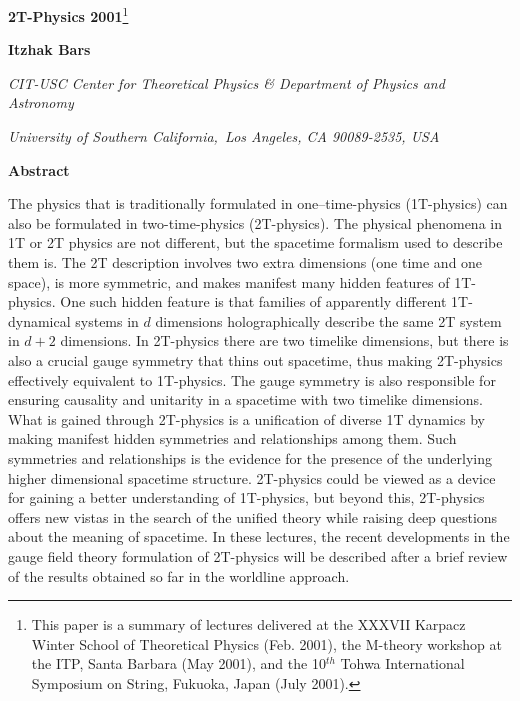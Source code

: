 \documentclass[a4paper,12pt]{article}
\begin{document}

{\vskip1.5cm}

\begin{center}
{\Large \textbf{2T-Physics 2001}}{\footnote{%
This paper is a summary of lectures delivered at the XXXVII
Karpacz Winter School of Theoretical Physics (Feb. 2001), the
M-theory workshop at the ITP, Santa Barbara (May 2001), and the
10$^{th}$ Tohwa International Symposium on String, Fukuoka, Japan
(July 2001).}}

\bigskip

{\vskip0.5cm}

\textbf{Itzhak Bars}

{\vskip0.5cm}

\textsl{CIT-USC Center for Theoretical Physics \& Department of
Physics and Astronomy}

\textsl{University of Southern California,\ Los Angeles, CA
90089-2535, USA}

{\vskip0.5cm}

\textbf{Abstract}
\end{center}

The physics that is traditionally formulated in one--time-physics
(1T-physics) can also be formulated in two-time-physics
(2T-physics). The physical phenomena in 1T or 2T physics are not
different, but the spacetime formalism used to describe them is.
The 2T description involves two extra dimensions (one time and one
space), is more symmetric, and makes manifest many hidden features
of 1T-physics. One such hidden feature is that families of
apparently different 1T-dynamical systems in $d$ dimensions
holographically describe the same 2T system in $d+2$ dimensions.
In 2T-physics there are two timelike dimensions, but there is also
a crucial gauge symmetry that thins out spacetime, thus making
2T-physics effectively equivalent to 1T-physics. The gauge
symmetry is also responsible for ensuring causality and unitarity
in a spacetime with two timelike dimensions. What is gained
through 2T-physics is a unification of diverse 1T dynamics by
making manifest hidden symmetries and relationships among them.
Such symmetries and relationships is the evidence for the presence
of the underlying higher dimensional spacetime structure.
2T-physics could be viewed as a device for gaining a better
understanding of 1T-physics, but beyond this, 2T-physics offers
new vistas in the search of the unified theory while raising deep
questions about the meaning of spacetime. In these lectures, the
recent developments in the gauge field theory formulation of
2T-physics will be described after a brief review of the results
obtained so far in the worldline approach.
\end{document}
